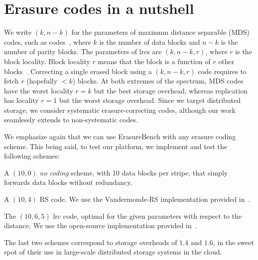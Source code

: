 \section{Erasure codes in a nutshell}
\label{sec:codes}

We write $(k,n-k)$ for the parameters of maximum distance separable (MDS) codes, such as  codes~\autocite{reed-solomon}, where $k$ is the number of data blocks and $n-k$ is the number of parity blocks. 
The parameters of \acp{lrc} are  $(k,n-k,r)$, where $r$ is the block locality. 
Block locality $r$ means that the block is a function of $r$ other blocks~\autocite{XorbasVLDB}. Correcting a single erased block using a $(k,n-k,r)$ code requires to fetch $r$ (hopefully $<k$) blocks. 
At both extremes of the spectrum, MDS codes have the worst locality $r=k$ but the best storage overhead, whereas replication has locality $r=1$ but the worst storage overhead. 
Since we target distributed storage, we consider systematic erasure-correcting codes, although our work seamlessly extends to non-systematic codes. %

We emphasize again that we can use ErasureBench with any erasure coding scheme. This being said, to test our platform, we implement and test the following schemes:
\begin{description}
\item[\textbf{NC}] A $(10,0)$ \emph{no coding} scheme, with 10 data blocks per stripe, that simply forwards data blocks without redundancy. %
\item[\textbf{\acs{rs}}] A $(10,4)$ RS code. We use the Vandermonde-RS implementation provided in~\autocite{XorbasVLDB}.  
\item[\textbf{\acs{lrc}}] The $(10,6,5)$ \acs{lrc} code, optimal for the given parameters with respect to the distance. We use the open-source implementation provided in~\autocite{XorbasVLDB}.
\end{description}
The last two schemes correspond to storage overheads of $1.4$ and $1.6$, in the sweet spot of their use in large-scale distributed storage systems in the cloud.
